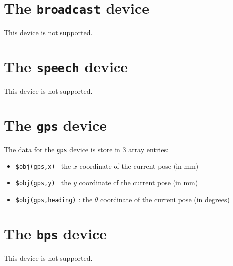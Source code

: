 \documentclass[11pt]{article}
\begin{document}
\section{The {\tt broadcast} device}
This device is not supported.

\section{The {\tt speech} device}
This device is not supported.

\section{The {\tt gps} device}
The data for the {\tt gps} device is store in 3 array entries:
\begin{itemize}
\item {\tt \$obj(gps,x)} : the $x$ coordinate of the current pose (in mm)
\item {\tt \$obj(gps,y)} : the $y$ coordinate of the current pose (in mm)
\item {\tt \$obj(gps,heading)} : the $\theta$ coordinate of the current pose 
(in degrees)
\end{itemize}

\section{The {\tt bps} device}
This device is not supported.
\end{document}
